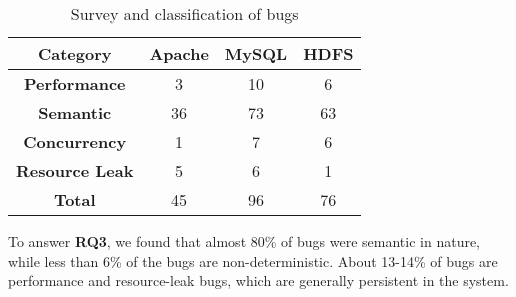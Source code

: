 \begin{table}[]
\centering
\begin{tabular}{cccc}
\toprule
\textbf{Category} & \textbf{Apache} & \textbf{MySQL} & \textbf{HDFS} \\ \midrule
\textbf{Performance} & 3 & 10 & 6 \\ 
\textbf{Semantic} & 36 & 73 & 63 \\ 
\textbf{Concurrency} & 1 & 7 & 6 \\ 
\textbf{Resource Leak} & 5 & 6 & 1 \\ \midrule
\textbf{Total} & 45 & 96 & 76 \\
\bottomrule
\end{tabular}
\caption{Survey and classification of bugs}
\label{tab:survey}
\end{table}


\begin{tcolorbox}
	To answer \textbf{RQ3}, we found that almost 80\% of bugs were semantic in nature, while less than 6\% of the bugs are non-deterministic.
	About 13-14\% of bugs are performance and resource-leak bugs, which are generally persistent in the system.
\end{tcolorbox}